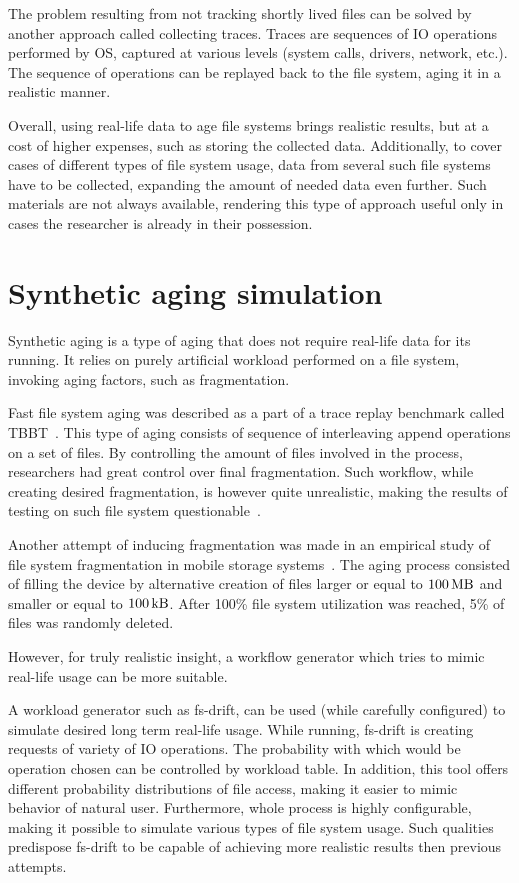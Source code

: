 \documentclass[
  color, %
  table, %
  lof,   %
  lot,   %
]{fithesis3}
\begin{document}
The problem resulting from not tracking shortly lived files can be solved by another approach called collecting traces. Traces are sequences of IO operations performed by OS, captured at various levels (system calls, drivers, network, etc.). The sequence of operations can be replayed back to the file system, aging it in a realistic manner.

Overall, using real-life data to age file systems brings realistic results, but at a cost of higher expenses, such as storing the collected data. Additionally, to cover cases of different types of file system usage, data from several such file systems have to be collected, expanding the amount of needed data even further. Such materials are not always available, rendering this type of approach useful only in cases the researcher is already in their possession.

\section{Synthetic aging simulation}
Synthetic aging is a type of aging that does not require real-life data for its running. It relies on purely artificial workload performed on a file system, invoking aging factors, such as fragmentation.

Fast file system aging was described as a part of a trace replay benchmark called TBBT~\cite{Zhu:2005:TSA:1251028.1251052}. This type of aging consists of sequence of interleaving append operations on a set of files. By controlling the amount of files involved in the process, researchers had great control over final fragmentation. Such workflow, while creating desired fragmentation, is however quite unrealistic, making the results of testing on such file system questionable~\cite{Traeger:2008:NYS:1367829.1367831}.

Another attempt of inducing fragmentation was made in an empirical study of file system fragmentation in mobile storage systems~\cite{ji2016empirical}. The aging process consisted of filling the device by alternative creation of files larger or equal to $\SI{100}{\mega\byte}$ and smaller or equal to $\SI{100}{\kilo\byte}$. After 100\% file system utilization was reached, 5\% of files was randomly deleted. 

However, for truly realistic insight, a workflow generator which tries to mimic real-life usage can be more suitable.

A workload generator such as fs-drift\footnotemark[1], can be used (while carefully configured) to simulate desired long term real-life usage. While running, fs-drift is creating requests of variety of IO operations. The probability with which would be operation chosen can be controlled by workload table. In addition, this tool offers different probability distributions of file access, making it easier to mimic behavior of natural user. Furthermore, whole process is highly configurable, making it possible to simulate various types of file system usage. Such qualities predispose fs-drift to be capable of achieving more realistic results then previous attempts.
\end{document}
